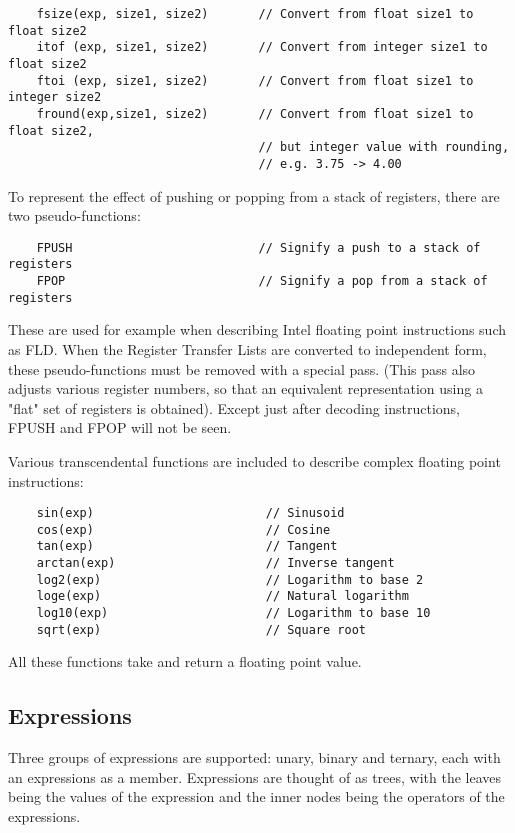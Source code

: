 {\small
\begin{verbatim}
    fsize(exp, size1, size2)       // Convert from float size1 to float size2
    itof (exp, size1, size2)       // Convert from integer size1 to float size2
    ftoi (exp, size1, size2)       // Convert from float size1 to integer size2
    fround(exp,size1, size2)       // Convert from float size1 to float size2,
                                   // but integer value with rounding,
                                   // e.g. 3.75 -> 4.00
\end{verbatim}
}

To represent the effect of pushing or popping from a stack of registers, there
are two pseudo-functions:
{\small
\begin{verbatim}
    FPUSH                          // Signify a push to a stack of registers
    FPOP                           // Signify a pop from a stack of registers
\end{verbatim}
}

These are used for example when describing Intel floating point instructions
such as FLD. When the Register Transfer Lists are converted to independent
form, these pseudo-functions must be removed with a special pass. (This pass
also adjusts various register numbers, so that an equivalent representation
using a "flat" set of registers is obtained). Except just after decoding
instructions, FPUSH and FPOP will not be seen.

Various transcendental functions are included to describe complex floating
point instructions:

{\small
\begin{verbatim}
    sin(exp)                        // Sinusoid
    cos(exp)                        // Cosine
    tan(exp)                        // Tangent
    arctan(exp)                     // Inverse tangent
    log2(exp)                       // Logarithm to base 2
    loge(exp)                       // Natural logarithm
    log10(exp)                      // Logarithm to base 10
    sqrt(exp)                       // Square root
\end{verbatim}
}

All these functions take and return a floating point value.


\subsection{Expressions}
\label{sec-exps}
Three groups of expressions are supported: unary, binary and
ternary, each with an expressions as a member.   Expressions
are thought of as trees, with the leaves being the values of
the expression and the inner nodes being the operators of the
expressions.


